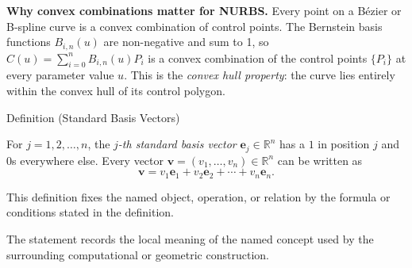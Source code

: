 \DefinitionalRoot

\begin{remark*}[Exposition]
\textbf{Why convex combinations matter for NURBS.}
Every point on a B\'{e}zier or B-spline curve is a convex combination of control points.
The Bernstein basis functions $B_{i,n}(u)$ are non-negative and sum to 1,
so $C(u) = \sum_{i=0}^n B_{i,n}(u) P_i$ is a convex combination of the control
points $\{P_i\}$ at every parameter value $u$.
This is the \emph{convex hull property}: the curve lies entirely within the convex hull
of its control polygon.
\end{remark*}

\begin{definitionbox}{Definition (Standard Basis Vectors)}
\begin{definition}
\label{def:standard-basis-vectors}
For $j = 1, 2, \ldots, n$, the \emph{$j$-th standard basis vector} $\mathbf{e}_j \in \mathbb{R}^n$
has a $1$ in position $j$ and $0$s everywhere else.
Every vector $\mathbf{v} = (v_1, \ldots, v_n) \in \mathbb{R}^n$ can be written as
\[
  \mathbf{v} = v_1 \mathbf{e}_1 + v_2 \mathbf{e}_2 + \cdots + v_n \mathbf{e}_n.
\]
\end{definition}
\end{definitionbox}
\begin{remark*}
This definition fixes the named object, operation, or relation by the formula
or conditions stated in the definition.
\end{remark*}

\begin{remark*}[Interpretation]
The statement records the local meaning of the named concept used by the
surrounding computational or geometric construction.
\end{remark*}

\DefinitionalRoot
